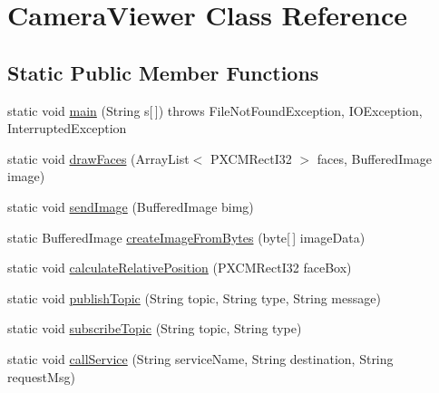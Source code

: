 \hypertarget{class_camera_viewer}{}\section{Camera\+Viewer Class Reference}
\label{class_camera_viewer}
\subsection*{Static Public Member Functions}
\begin{DoxyCompactItemize}
\item 
static void \hyperlink{class_camera_viewer_adf55f83b4c0f8fde5ed17930f9b982d2}{main} (String s\mbox{[}$\,$\mbox{]})  throws File\+Not\+Found\+Exception, I\+O\+Exception, Interrupted\+Exception 	
\item 
static void \hyperlink{class_camera_viewer_a919f756424f1b490c9aa36d36e193e5e}{draw\+Faces} (Array\+List$<$ P\+X\+C\+M\+Rect\+I32 $>$ faces, Buffered\+Image image)
\item 
static void \hyperlink{class_camera_viewer_ae238a779883f977dbbda0940bc5a3878}{send\+Image} (Buffered\+Image bimg)
\item 
static Buffered\+Image \hyperlink{class_camera_viewer_a6e22dd4f0040cd4b4a22b0f798a543ed}{create\+Image\+From\+Bytes} (byte\mbox{[}$\,$\mbox{]} image\+Data)
\item 
static void \hyperlink{class_camera_viewer_a8cb2f58e42efefc07b937d4995e36fb5}{calculate\+Relative\+Position} (P\+X\+C\+M\+Rect\+I32 face\+Box)
\item 
static void \hyperlink{class_camera_viewer_a0aa5f46d01dc041485e0f5d68bb3af99}{publish\+Topic} (String topic, String type, String message)
\item 
static void \hyperlink{class_camera_viewer_a53e220f2df68b4491868035b1da2878d}{subscribe\+Topic} (String topic, String type)
\item 
static void \hyperlink{class_camera_viewer_abc264bdcd61579567fa4d0f52c1ad59e}{call\+Service} (String service\+Name, String destination, String request\+Msg)
\end{DoxyCompactItemize}
